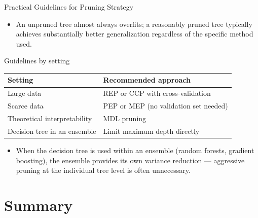 \begin{frame}{Practical Guidelines for Pruning Strategy}
  \begin{itemize}
    \item An \alert{unpruned tree almost always overfits}; a reasonably pruned tree typically
          achieves substantially better generalization regardless of the specific method used.
  \end{itemize}
  \begin{block}{Guidelines by setting}
    \begin{tabular}{ll}
      \toprule
      \textbf{Setting} & \textbf{Recommended approach} \\
      \midrule
      Large data & REP or CCP with cross-validation \\
      Scarce data & PEP or MEP (no validation set needed) \\
      Theoretical interpretability & MDL pruning \\
      Decision tree in an ensemble & Limit maximum depth directly \\
      \bottomrule
    \end{tabular}
  \end{block}
  \begin{itemize}
    \item When the decision tree is used within an \alert{ensemble} (random forests, gradient
          boosting), the ensemble provides its own variance reduction — aggressive pruning at the
          individual tree level is often \alert{unnecessary}.
  \end{itemize}
\end{frame}

\section{Summary}

